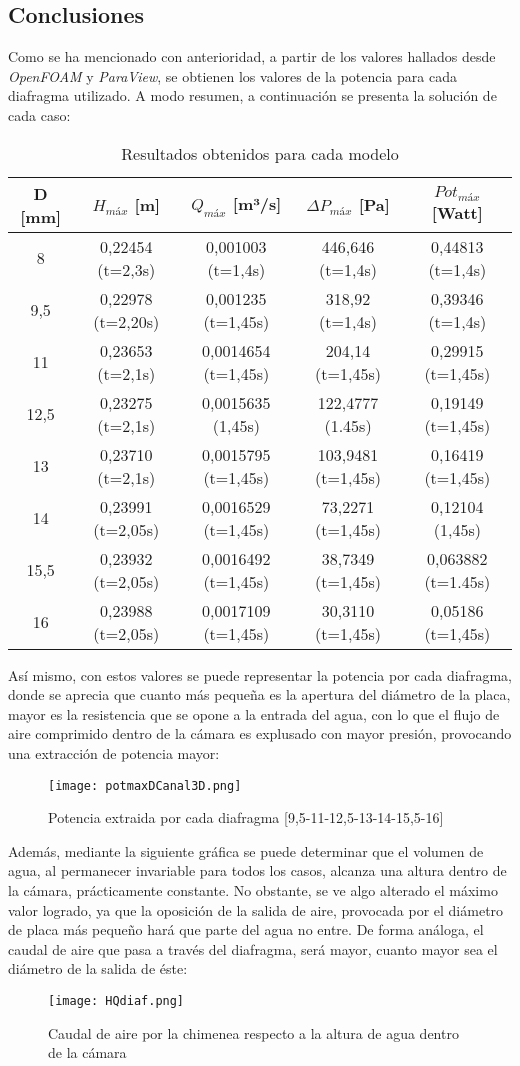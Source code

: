 
\subsection{Conclusiones}\label{header-n249}

Como se ha mencionado con anterioridad, a partir de los valores hallados
desde \emph{OpenFOAM} y \emph{ParaView}, se obtienen los valores de la
potencia para cada diafragma utilizado. A modo resumen, a continuación
se presenta la solución de cada caso:

\begin{longtable}[]{@{}ccccc@{}}
\caption{Resultados obtenidos para cada modelo}
\toprule
D {[}mm{]} & \(H_{máx}\) {[}m{]} & \(Q_{máx}\) {[}m³/s{]} &
\(\Delta P_{máx}\) {[}Pa{]} & \(Pot_{máx}\) {[}Watt{]}\tabularnewline
\midrule
\endhead
8 & 0,22454 (t=2,3s) & 0,001003 (t=1,4s) & 446,646 (t=1,4s) & 0,44813
(t=1,4s)\tabularnewline
9,5 & 0,22978 (t=2,20s) & 0,001235 (t=1,45s) & 318,92 (t=1,4s) & 0,39346
(t=1,4s)\tabularnewline
11 & 0,23653 (t=2,1s) & 0,0014654 (t=1,45s) & 204,14 (t=1,45s) & 0,29915
(t=1,45s)\tabularnewline
12,5 & 0,23275 (t=2,1s) & 0,0015635 (1,45s) & 122,4777 (1.45s) & 0,19149
(t=1,45s)\tabularnewline
13 & 0,23710 (t=2,1s) & 0,0015795 (t=1,45s) & 103,9481 (t=1,45s) &
0,16419 (t=1,45s)\tabularnewline
14 & 0,23991 (t=2,05s) & 0,0016529 (t=1,45s) & 73,2271 (t=1,45s) &
0,12104 (1,45s)\tabularnewline
15,5 & 0,23932 (t=2,05s) & 0,0016492 (t=1,45s) & 38,7349 (t=1,45s) &
0,063882 (t=1.45s)\tabularnewline
16 & 0,23988 (t=2,05s) & 0,0017109 (t=1,45s) & 30,3110 (t=1,45s) &
0,05186 (t=1,45s)\tabularnewline
\bottomrule
\end{longtable}

Así mismo, con estos valores se puede representar la potencia por cada
diafragma, donde se aprecia que cuanto más pequeña es la apertura del
diámetro de la placa, mayor es la resistencia que se opone a la entrada
del agua, con lo que el flujo de aire comprimido dentro de la cámara es
explusado con mayor presión, provocando una extracción de potencia
mayor:

\begin{figure}
\centering
\texttt{[image: potmaxDCanal3D.png]}
\caption{Potencia extraida por cada diafragma [9,5-11-12,5-13-14-15,5-16]}
\label{fig:potmaxDCanal3D}
\end{figure}

Además, mediante la siguiente gráfica se puede determinar que el volumen
de agua, al permanecer invariable para todos los casos, alcanza una
altura dentro de la cámara, prácticamente constante. No obstante, se ve
algo alterado el máximo valor logrado, ya que la oposición de la salida
de aire, provocada por el diámetro de placa más pequeño hará que parte
del agua no entre. De forma análoga, el caudal de aire que pasa a través
del diafragma, será mayor, cuanto mayor sea el diámetro de la salida de
éste:

\begin{figure}
\centering
\texttt{[image: HQdiaf.png]}
\caption[Caudal de aire por la chimenea]{Caudal de aire por la chimenea respecto a la altura de agua dentro de la cámara}
\label{fig:HQdiaf}
\end{figure}

